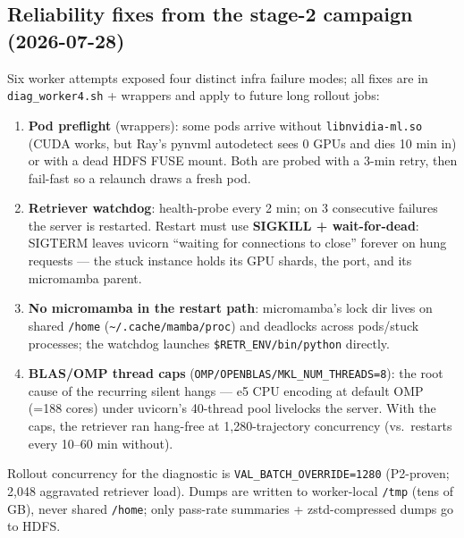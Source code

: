 \documentclass[10pt]{article}
\newcommand{\cmd}[1]{\texttt{\small #1}}
\begin{document}
\subsection{Reliability fixes from the stage-2 campaign (2026-07-28)}
Six worker attempts exposed four distinct infra failure modes; all fixes are in
\cmd{diag\_worker4.sh} + wrappers and apply to future long rollout jobs:
\begin{enumerate}
\item \textbf{Pod preflight} (wrappers): some pods arrive without \cmd{libnvidia-ml.so} (CUDA works,
but Ray's pynvml autodetect sees 0 GPUs and dies 10 min in) or with a dead HDFS FUSE mount. Both are
probed with a 3-min retry, then fail-fast so a relaunch draws a fresh pod.
\item \textbf{Retriever watchdog}: health-probe every 2 min; on 3 consecutive failures the server is
restarted. Restart must use \textbf{SIGKILL + wait-for-dead}: SIGTERM leaves uvicorn ``waiting for
connections to close'' forever on hung requests --- the stuck instance holds its GPU shards, the port,
and its micromamba parent.
\item \textbf{No micromamba in the restart path}: micromamba's lock dir lives on shared \cmd{/home}
(\cmd{\textasciitilde/.cache/mamba/proc}) and deadlocks across pods/stuck processes; the watchdog
launches \cmd{\$RETR\_ENV/bin/python} directly.
\item \textbf{BLAS/OMP thread caps} (\cmd{OMP/OPENBLAS/MKL\_NUM\_THREADS=8}): the root cause of the
recurring silent hangs --- e5 CPU encoding at default OMP (=188 cores) under uvicorn's 40-thread pool
livelocks the server. With the caps, the retriever ran hang-free at 1{,}280-trajectory concurrency
(vs.\ restarts every 10--60 min without).
\end{enumerate}
Rollout concurrency for the diagnostic is \cmd{VAL\_BATCH\_OVERRIDE=1280} (P2-proven; 2{,}048
aggravated retriever load). Dumps are written to worker-local \cmd{/tmp} (tens of GB), never shared
\cmd{/home}; only pass-rate summaries + zstd-compressed dumps go to HDFS.
\end{document}
